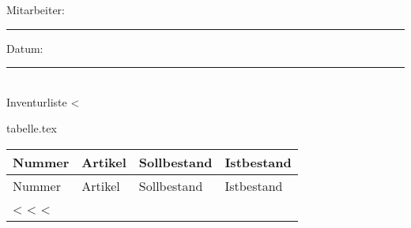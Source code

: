 \documentclass[a4paper,foldmarks=true]{scrartcl}
\begin{document}
\fontsize{12}{15pt plus 0.15pt minus 0.1pt}\selectfont
Mitarbeiter: \rule{7cm}{1pt} Datum:\rule{3cm}{1pt} \\
Inventurliste <%
\begin{filecontents}{tabelle.tex}

\begin{longtable}{@{}lXp{70px}p{100px}@{}} %
        Nummer & Artikel & Sollbestand & Istbestand \\
	\hline %
    \endfirsthead

        Nummer & Artikel & Sollbestand & Istbestand \\
	\hline %
    \endhead

  \endfoot

	\hline %
  \endlastfoot

	<%
            <%
	<%

	\hline
\end{longtable}
\end{filecontents}

\vspace{5mm}

\label{LastPage}
\end{document}
